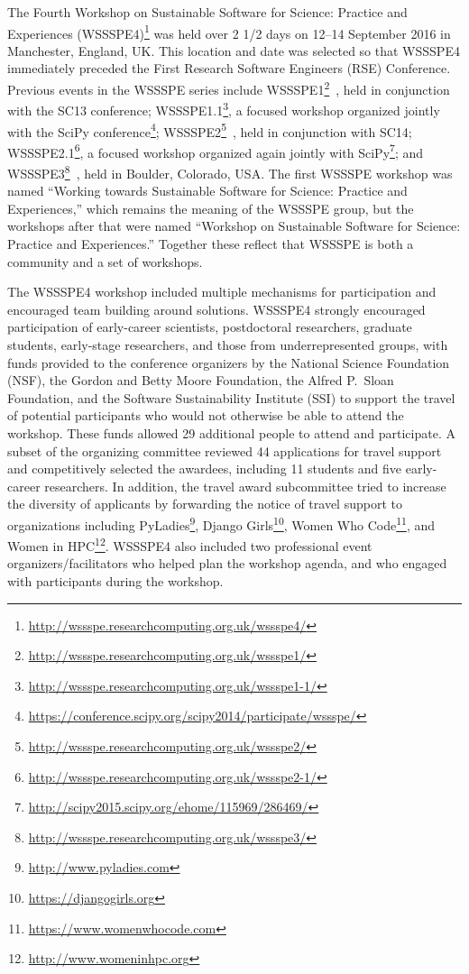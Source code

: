 \documentclass[11pt, oneside]{amsart}
\newcommand{\todo}[1]{{\color{blue}$\blacksquare$~\textsf{[TODO: #1]}}}
\begin{document}
The Fourth Workshop on Sustainable Software for Science: Practice and Experiences
(WSSSPE4)\footnote{\url{http://wssspe.researchcomputing.org.uk/wssspe4/}} was
held over 2 1/2 days on 12--14 September 2016 in Manchester, England, UK.
This location and date was selected so that WSSSPE4 immediately preceded the
First Research Software Engineers (RSE) Conference.
Previous events in the WSSSPE series include
WSSSPE1\footnote{\url{http://wssspe.researchcomputing.org.uk/wssspe1/}}~\cite{WSSSPE1-pre-report,WSSSPE1},
held in conjunction with the SC13 conference;
WSSSPE1.1\footnote{\url{http://wssspe.researchcomputing.org.uk/wssspe1-1/}}, a
focused workshop organized jointly with the SciPy
conference\footnote{\url{https://conference.scipy.org/scipy2014/participate/wssspe/}};
WSSSPE2\footnote{\url{http://wssspe.researchcomputing.org.uk/wssspe2/}}~\cite{WSSSPE2-pre-report,WSSSPE2},
held in conjunction with SC14;
WSSSPE2.1\footnote{\url{http://wssspe.researchcomputing.org.uk/wssspe2-1/}}, a
focused workshop organized again jointly with
SciPy\footnote{\url{http://scipy2015.scipy.org/ehome/115969/286469/}};
and WSSSPE3\footnote{\url{http://wssspe.researchcomputing.org.uk/wssspe3/}}~\cite{WSSSPE3},
held in Boulder, Colorado, USA.
The first WSSSPE workshop was named
``Working towards
Sustainable Software for Science: Practice and Experiences,'' which remains the meaning
of the WSSSPE group, but the workshops after that were named
``Workshop on Sustainable
Software for Science: Practice and Experiences.'' Together these reflect
that WSSSPE is both a community and a set of workshops.


The WSSSPE4 workshop included multiple mechanisms for participation and
encouraged team building around solutions. WSSSPE4 strongly encouraged participation
of early-career scientists, postdoctoral researchers, graduate students,
early-stage researchers, and those from underrepresented groups,
with funds provided to the conference organizers by the National Science
Foundation (NSF), the Gordon and Betty Moore Foundation, the Alfred P.~Sloan Foundation, and the Software
Sustainability Institute (SSI) to support the travel of potential participants
who would not otherwise be able to attend the workshop. These
funds allowed 29 additional people to attend and participate. A subset of the
organizing committee reviewed 44 applications for travel support and
competitively selected the awardees, including 11 students and five early-career
researchers. In addition, the travel award subcommittee tried to increase the
diversity of applicants by forwarding the notice of travel support to
organizations including PyLadies\footnote{\url{http://www.pyladies.com}},
Django Girls\footnote{\url{https://djangogirls.org}},
Women Who Code\footnote{\url{https://www.womenwhocode.com}}, and
Women in HPC\footnote{\url{http://www.womeninhpc.org}}.
%
WSSSPE4 also included two professional event organizers/facilitators who helped
plan the workshop agenda,
and who engaged with participants during the workshop.
\end{document}
